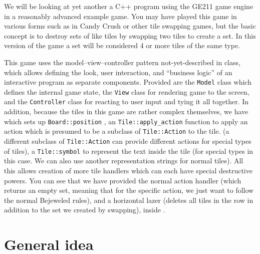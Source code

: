 \documentclass{tufte-handout}
\begin{document}
\maketitle

We will be looking at yet another a C++ program using the GE211 game
engine in a reasonably advanced example game. You may have played this game
in various forms such as in Candy Crush or other tile swapping games, but the
basic concept is to destroy sets of like tiles by swapping two tiles to
create a set. In this version of the game a set will be considered 4 or more
tiles of the same type.

This game uses the model--view--controller pattern not-yet-described in
class, which allows defining the look, user interaction, and ``business
logic'' of an interactive program as separate components. Provided are
the \texttt{Model} class which defines the internal game state, the
\texttt{View} class for rendering game to the screen, and the
\texttt{Controller} class for reacting to user input and tying it all
together. In addition, because the tiles in this game are rather complex
themselves, we have  which sets up \texttt{Board::position}
,  an \texttt{Tile::apply_action} function to apply an action which is presumed to be a subclass of \texttt{Tile::Action} to the tile. (a different subclass of \texttt{Tile::Action} can provide different actions for special types of
tiles), a \texttt{Tile::symbol} to represent the text inside the tile (for special types in this case. We can also use another representation strings for normal tiles). All this allows creation of more tile handlers
which can each have special destructive powers. You can see that we have provided
the normal action handler (which returns an empty set, meaning that for the specific action, we just want to follow the normal Bejeweled rules), and a horizontal
lazer (deletes all tiles in the row in addition to the set we created by swapping),
inside .

\CxxPrelims

\section{General idea}
\end{document}
